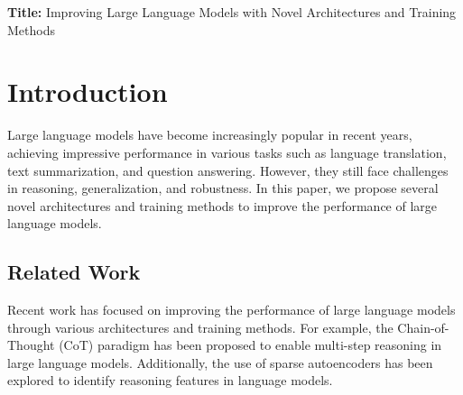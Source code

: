 \documentclass{article}
\begin{document}
\begin{titlepage}
\centering
\large
\textbf{Title:} Improving Large Language Models with Novel Architectures and Training Methods

\end{titlepage}

\begin{abstract}
Large language models have achieved impressive performance in various tasks, but they still face challenges in reasoning, generalization, and robustness. In this paper, we propose several novel architectures and training methods to improve the performance of large language models. We introduce a new paradigm for reasoning, called Multiplex Thinking, which uses token-wise branch-and-merge to reason softly and maintain a distribution over plausible next steps. We also propose a new framework for robust and generalist computer-using agents, called OS-Symphony, which utilizes milestone-driven long-term memory and visually aligned tutorials to enable trajectory-level self-correction and fidelity in unseen scenarios. Additionally, we introduce a new method for segmental advantage estimation, called SAE, which mitigates the bias that Generalized Advantage Estimation (GAE) can incur in sparse-reward reinforcement learning with verifiable rewards (RLVR). Our experimental results demonstrate the effectiveness of these novel architectures and training methods, achieving significant improvements in final scores, training stability, and sample efficiency.

\end{abstract}

\section{Introduction}

Large language models have become increasingly popular in recent years, achieving impressive performance in various tasks such as language translation, text summarization, and question answering. However, they still face challenges in reasoning, generalization, and robustness. In this paper, we propose several novel architectures and training methods to improve the performance of large language models.

\subsection{Related Work}

Recent work has focused on improving the performance of large language models through various architectures and training methods. For example, the Chain-of-Thought (CoT) paradigm has been proposed to enable multi-step reasoning in large language models. Additionally, the use of sparse autoencoders has been explored to identify reasoning features in language models.
\end{document}
